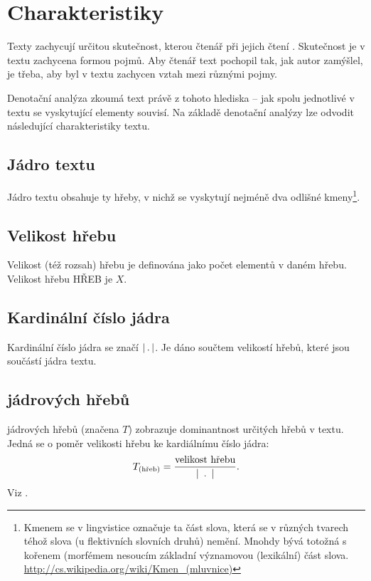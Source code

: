 \documentclass[dp.tex]{subfiles}
\begin{document}
\section{Charakteristiky}

Texty zachycují určitou skutečnost, kterou čtenář při jejich čtení . Skutečnost je v textu zachycena formou pojmů. Aby čtenář text pochopil tak, jak autor zamýšlel, je třeba, aby byl v textu zachycen vztah mezi různými pojmy.

Denotační analýza zkoumá text právě z tohoto hlediska -- jak spolu jednotlivé v textu se vyskytující elementy souvisí. Na základě denotační analýzy lze odvodit následující charakteristiky textu.

\subsection{Jádro textu}
Jádro textu obsahuje ty hřeby, v nichž se vyskytují nejméně dva odlišné kmeny\footnote{Kmenem se v lingvistice označuje ta část slova, která se v různých tvarech téhož slova (u flektivních slovních druhů) nemění. Mnohdy bývá totožná s kořenem (morfémem nesoucím základní významovou (lexikální) část slova. \url{http://cs.wikipedia.org/wiki/Kmen_(mluvnice)} }.

\subsection{Velikost hřebu}
Velikost (též rozsah) hřebu je definována jako počet elementů v daném hřebu. Velikost hřebu %
HŘEB je $X$.

\subsection{Kardinální číslo jádra}
Kardinální číslo jádra se značí $|\kern 2pt.\kern 2pt|$. Je dáno součtem velikostí hřebů, které jsou součástí jádra textu.

\subsection{ jádrových hřebů}
 jádrových hřebů (značena $T$) zobrazuje dominantnost určitých hřebů v textu.  Jedná se o poměr velikosti hřebu ke kardiálnímu číslo jádra:
\begin{equation}
T_\text{(hřeb)}=\frac{\text{velikost hřebu}}{|\kern 5pt.\kern 5pt|}.
\end{equation}
Viz \cite[str. 302]{Wimmer2003}. 
\end{document}
